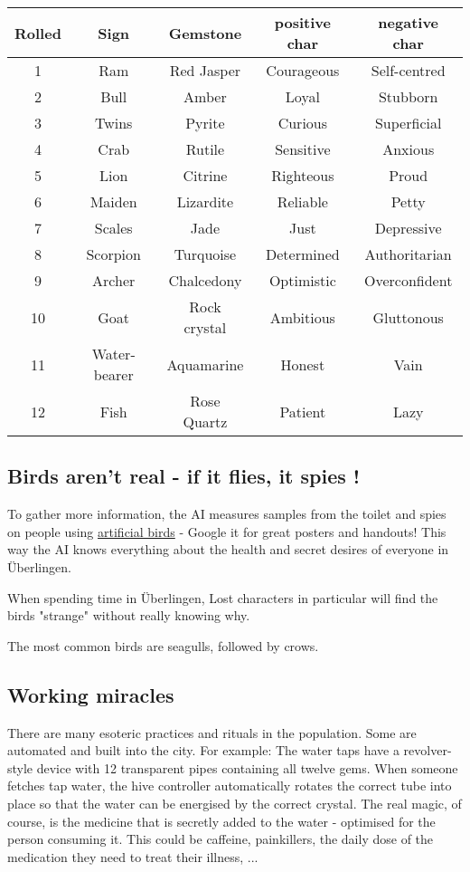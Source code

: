 \begin{tabularx}{\linewidth}{ccccc}
    \hline
    Rolled & Sign & Gemstone & positive char & negative char \\ [0.5ex]
    \hline
    1 & Ram & Red Jasper & Courageous & Self-centred   \\
    2 & Bull & Amber & Loyal & Stubborn   \\
    3 & Twins & Pyrite & Curious & Superficial  \\
    4 & Crab & Rutile & Sensitive & Anxious  \\
    5 & Lion & Citrine & Righteous & Proud  \\
    6 & Maiden & Lizardite & Reliable & Petty  \\
    7 & Scales & Jade & Just & Depressive  \\
    8 & Scorpion & Turquoise & Determined & Authoritarian  \\
    9 & Archer & Chalcedony & Optimistic & Overconfident  \\
    10 & Goat & Rock crystal & Ambitious & Gluttonous  \\
    11 & Water-bearer & Aquamarine & Honest & Vain  \\
    12 & Fish & Rose Quartz & Patient & Lazy  \\
\end{tabularx}

\subsection{Birds aren't real - if it flies, it spies !}

To gather more information, the AI measures samples from the toilet and spies on people using \href{https://en.wikipedia.org/wiki/Birds_Aren%27t_Real}{artificial birds} - Google it for great posters and handouts!
This way the AI knows everything about the health and secret desires of everyone in Überlingen.

When spending time in Überlingen, Lost characters in particular will find the birds "strange" without really knowing why.

The most common birds are seagulls, followed by crows.

\subsection{Working miracles}

There are many esoteric practices and rituals in the population. Some are automated and built into the city. For example: The water taps have a revolver-style device with 12 transparent pipes containing all twelve gems. When someone fetches tap water, the hive controller automatically rotates the correct tube into place so that the water can be energised by the correct crystal.
The real magic, of course, is the medicine that is secretly added to the water - optimised for the person consuming it. This could be caffeine, painkillers, the daily dose of the medication they need to treat their illness, ...

